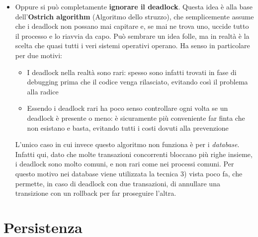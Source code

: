 \documentclass[11pt, a4paper, titlepage, oneside]{scrbook}
\begin{document}
\begin{itemize}
\begin{itemize}
        \item Quanti thread è necessario uccidere per eliminare il deadlock
        \item Thread Batch: meglio eliminare un batch (ossia un processo di CPU, senza interazione con l'utente), rispetto a un thread interrativo, dato che quest'ultimo l'utente lo noterebbe molto di più
        \item Quante volte un thread è già stato scelto come vittima: è molto importante non scegliere sempre lo stesso thread come vittima, altrimenti si rischierebbe un problema di starvation
    \end{itemize}
    Il terzo caso funziona poi solo se lo stato della risorsa è salvabile e ripristinabile: non possiamo rubare le risorse a un thread che stava facendo delle modifiche a una struttura dati ad esempio, sennò la lascerebbe in uno stato incoerente.
    \item Oppure si può completamente \textbf{ignorare il deadlock}. Questa idea è alla base dell'\textbf{Ostrich algorithm} (Algoritmo dello struzzo), che semplicemente assume che i deadlock non possano mai capitare e, se mai ne trova uno, uccide tutto il processo e lo riavvia da capo. Può sembrare un idea folle, ma in realtà è la scelta che quasi tutti i veri sistemi operativi operano. Ha senso in particolare per due motivi:
    \begin{itemize}
        \item I deadlock nella realtà sono rari: spesso sono infatti trovati in fase di debugging prima che il codice venga rilasciato, evitando così il problema alla radice
        \item Essendo i deadlock rari ha poco senso controllare ogni volta se un deadlock è presente o meno: è sicuramente più conveniente far finta che non esistano e basta, evitando tutti i costi dovuti alla prevenzione
    \end{itemize}
    L'unico caso in cui invece questo algoritmo non funziona è per i \textit{database}. Infatti qui, dato che molte transazioni concorrenti bloccano più righe insieme, i deadlock sono molto comuni, e non rari come nei processi comuni. Per questo motivo nei database viene utilizzata la tecnica 3) vista poco fa, che permette, in caso di deadlock con due transazioni, di annullare una transizione con un rollback per far proseguire l'altra.
\end{itemize}

\chapter{Persistenza}
\end{document}

